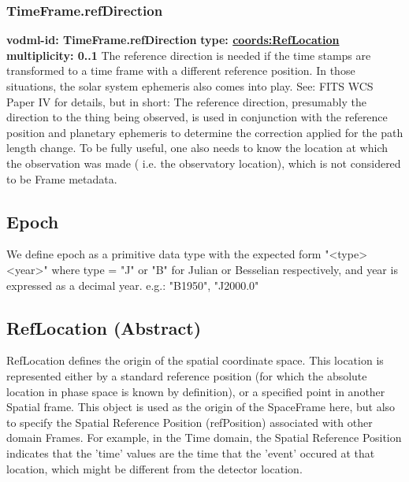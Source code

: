     \subsubsection{TimeFrame.refDirection}
      \textbf{vodml-id: TimeFrame.refDirection} \newline
      \textbf{type: \hyperref[sect:RefLocation]{coords:RefLocation}} \newline
      \textbf{multiplicity: 0..1} \newline 
      The reference direction is needed if the time stamps are transformed to a time frame with a different reference position. In those situations, the solar system ephemeris also comes into play. See: FITS WCS Paper IV for details, but in short: The reference direction, presumably the direction to the thing being observed, is used in conjunction with the reference position and planetary ephemeris to determine the correction applied for the path length change. To be fully useful, one also needs to know the location at which the observation was made ( i.e. the observatory location), which is not considered to be Frame metadata.


  \subsection{Epoch}
  \label{sect:Epoch}
  We define epoch as a primitive data type with the expected form "<type><year>" where type = "J" or "B" for Julian or Besselian respectively, and year is expressed as a decimal year. e.g.: "B1950", "J2000.0"


  \subsection{RefLocation (Abstract)}
  \label{sect:RefLocation}
    RefLocation defines the origin of the spatial coordinate space. This location is represented either by a standard reference position (for which the absolute location in phase space is known by definition), or a specified point in another Spatial frame. This object is used as the origin of the SpaceFrame here, but also to specify the Spatial Reference Position (refPosition) associated with other domain Frames. For example, in the Time domain, the Spatial Reference Position indicates that the 'time' values are the time that the 'event' occured at that location, which might be different from the detector location.


